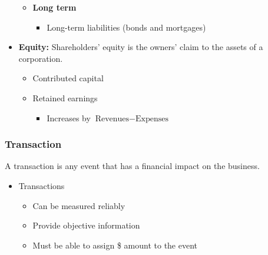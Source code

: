 \begin{definition}
\begin{itemize}
\begin{itemize}
            \item \textbf{Long term}
            \begin{itemize}
                \item Long-term liabilities (bonds and mortgages)
            \end{itemize}
        \end{itemize}
        \item \textbf{Equity:} Shareholders' equity is the owners' claim to the assets of a corporation. 
        \begin{itemize}
            \item Contributed capital
            \item Retained earnings
            \begin{itemize}
                \item Increases by $\text{Revenues} - \text{Expenses}$
            \end{itemize}
        \end{itemize}        
    \end{itemize}
\end{definition}

\subsubsection{Transaction}
\begin{definition}
    A transaction is any event that has a financial impact on the business.
    \begin{itemize}
        \item Transactions
        \begin{itemize}
            \item Can be measured reliably
            \item Provide objective information
            \item Must be able to assign \$ amount to the event
        \end{itemize}
    \end{itemize}    
\end{definition}

